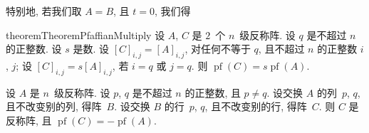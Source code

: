 \documentclass[../libro.tex]{subfiles}
\begin{document}
特别地, 若我们取 \(A = B\), 且 \(t = 0\),
我们得

\begin{restatable}{theorem}{TheoremPfaffianMultiply}
    设 \(A\), \(C\) 是 \(2\)~个 \(n\)~级反称阵.
    设 \(q\) 是不超过 \(n\) 的正整数.
    设 \(s\) 是数.
    设 \([C]_{i,j} = [A]_{i,j}\),
    对任何不等于 \(q\), 且不超过 \(n\) 的正整数 \(i\), \(j\);
    设 \([C]_{i,j} = s[A]_{i,j}\),
    若 \(i = q\) 或 \(j = q\).
    则 \(\operatorname{pf} {(C)} = s \operatorname{pf} {(A)}\).
\end{restatable}

\begin{theorem}
    设 \(A\) 是 \(n\)~级反称阵.
    设 \(p\), \(q\) 是不超过 \(n\) 的正整数, 且 \(p \neq q\).
    设交换 \(A\) 的列~\(p\), \(q\), 且不改变别的列, 得阵~\(B\).
    设交换 \(B\) 的行~\(p\), \(q\), 且不改变别的行, 得阵~\(C\).
    则 \(C\) 是反称阵, 且
    \(
        \operatorname{pf} {(C)} = -\operatorname{pf} {(A)}
    \).
\end{theorem}
\end{document}

